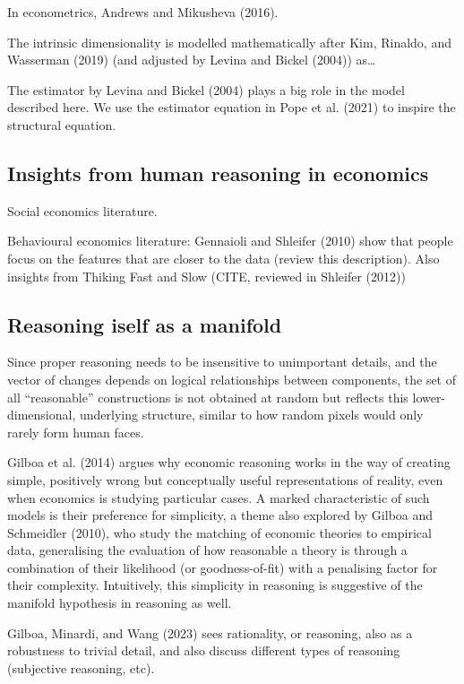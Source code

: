 \documentclass[
]{article}
\begin{document}
In econometrics, Andrews and Mikusheva (2016).

The intrinsic dimensionality is modelled mathematically after Kim,
Rinaldo, and Wasserman (2019) (and adjusted by Levina and Bickel (2004))
as\ldots{}

The estimator by Levina and Bickel (2004) plays a big role in the model
described here. We use the estimator equation in Pope et al. (2021) to
inspire the structural equation.

\subsection{Insights from human reasoning in
economics}\label{insights-from-human-reasoning-in-economics}

Social economics literature.

Behavioural economics literature: Gennaioli and Shleifer (2010) show
that people focus on the features that are closer to the data (review
this description). Also insights from Thiking Fast and Slow (CITE,
reviewed in Shleifer (2012))

\subsection{Reasoning iself as a
manifold}\label{reasoning-iself-as-a-manifold}

Since proper reasoning needs to be insensitive to unimportant details,
and the vector of changes depends on logical relationships between
components, the set of all ``reasonable'' constructions is not obtained
at random but reflects this lower-dimensional, underlying structure,
similar to how random pixels would only rarely form human faces.

Gilboa et al. (2014) argues why economic reasoning works in the way of
creating simple, positively wrong but conceptually useful
representations of reality, even when economics is studying particular
cases. A marked characteristic of such models is their preference for
simplicity, a theme also explored by Gilboa and Schmeidler (2010), who
study the matching of economic theories to empirical data, generalising
the evaluation of how reasonable a theory is through a combination of
their likelihood (or goodness-of-fit) with a penalising factor for their
complexity. Intuitively, this simplicity in reasoning is suggestive of
the manifold hypothesis in reasoning as well.

Gilboa, Minardi, and Wang (2023) sees rationality, or reasoning, also as
a robustness to trivial detail, and also discuss different types of
reasoning (subjective reasoning, etc).
\end{document}
